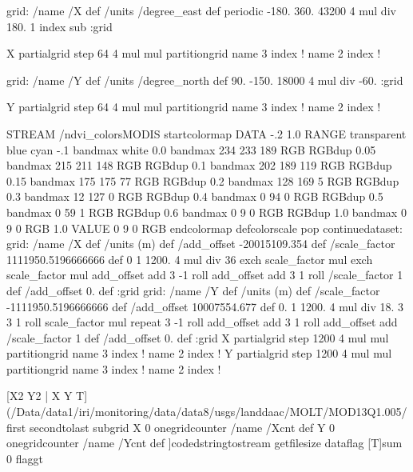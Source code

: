 
grid:
  /name /X def
  /units /degree_east def
  periodic
  -180.
  360.
  43200 4 mul div
  180.
  1 index sub
:grid

X partialgrid
step 64 4 mul mul partitiongrid
name 3 index !
name 2 index !

grid:
  /name /Y def
  /units /degree_north def
  90.
  -150.
  18000 4 mul div
  -60.
:grid

Y partialgrid
step 64 4 mul mul partitiongrid
name 3 index !
name 2 index !


\begin{ingrid}
STREAM
/ndvi_colorsMODIS {
startcolormap
DATA -.2 1.0 RANGE
transparent
blue
cyan -.1 bandmax
white 0.0 bandmax
234 233 189 RGB RGBdup 0.05 bandmax
215 211 148 RGB RGBdup 0.1 bandmax
202 189 119 RGB RGBdup 0.15 bandmax
175 175 77 RGB RGBdup 0.2 bandmax
128 169 5 RGB RGBdup 0.3 bandmax
12 127 0 RGB RGBdup 0.4 bandmax
0 94 0 RGB RGBdup 0.5 bandmax
0 59 1 RGB RGBdup 0.6 bandmax
0 9 0 RGB RGBdup 1.0 bandmax
0 9 0 RGB 1.0 VALUE
0 9 0 RGB
endcolormap } defcolorscale
pop
continuedataset:
grid:
/name /X def
/units (m) def
/add_offset  -20015109.354 def
/scale_factor  1111950.5196666666 def
0 1 1200. 4 mul div 36
exch scale_factor mul exch scale_factor mul
add_offset add
3 -1 roll add_offset add 3 1 roll
/scale_factor 1 def
/add_offset 0. def
:grid
grid:
/name /Y def
/units (m) def
/scale_factor  -1111950.5196666666 def
/add_offset 10007554.677 def
0. 1 1200. 4 mul div 18.
3 { 3 1 roll scale_factor mul } repeat
3 -1 roll add_offset add 3 1 roll
add_offset add
/scale_factor 1 def
/add_offset 0. def
:grid
X partialgrid step 1200 4 mul mul partitiongrid
name 3 index !
name 2 index !
Y partialgrid step 1200 4 mul mul partitiongrid
name 3 index !
name 2 index !
\end{ingrid}

[X2
    Y2 |
    X Y T] (/Data/data1/iri/monitoring/data/data8/usgs/landdaac/MOLT/MOD13Q1.005/%
         first secondtolast subgrid
         X
          0 onegridcounter
          /name /Xcnt def
          Y
           0 onegridcounter
           /name /Ycnt def
           ]codedstringtostream
     getfilesize dataflag
     [T]sum
     0 flaggt

